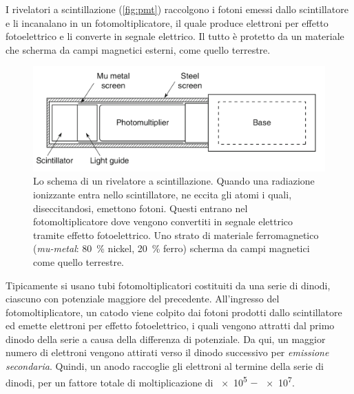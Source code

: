 \documentclass[../main.tex]{subfiles}
\begin{document}
I rivelatori a scintillazione (\autoref{fig:pmt}) raccolgono i fotoni emessi dallo scintillatore e li incanalano in un fotomoltiplicatore, il quale produce elettroni per effetto fotoelettrico e li converte in segnale elettrico. Il tutto è protetto da un materiale che scherma da campi magnetici esterni, come quello terrestre.

\begin{figure}[!b]
    \centering
    \includegraphics[width=\textwidth]{pmt_trasp.png}
    \caption{Lo schema di un rivelatore a scintillazione. Quando una radiazione ionizzante entra nello scintillatore, ne eccita gli atomi i quali, diseccitandosi, emettono fotoni. Questi entrano nel fotomoltiplicatore dove vengono convertiti in segnale elettrico tramite effetto fotoelettrico. Uno strato di materiale ferromagnetico (\emph{mu-metal}: \SI{80}{\%} nickel, \SI{20}{\%} ferro) scherma da campi magnetici come quello terrestre.
    \cite{spurio}}
    \label{fig:pmt}
\end{figure}


Tipicamente si usano tubi fotomoltiplicatori costituiti da una serie di dinodi, ciascuno con potenziale maggiore del precedente. All'ingresso del fotomoltiplicatore, un catodo viene colpito dai fotoni prodotti dallo scintillatore ed emette elettroni per effetto fotoelettrico, i quali vengono attratti dal primo dinodo della serie a causa della differenza di potenziale. Da qui, un maggior numero di elettroni vengono attirati verso il dinodo successivo per \emph{emissione secondaria}. Quindi, un anodo raccoglie gli elettroni al termine della serie di dinodi, per un fattore totale di moltiplicazione di \SI{e5}{} $-$ \SI{e7}{}.
\end{document}

